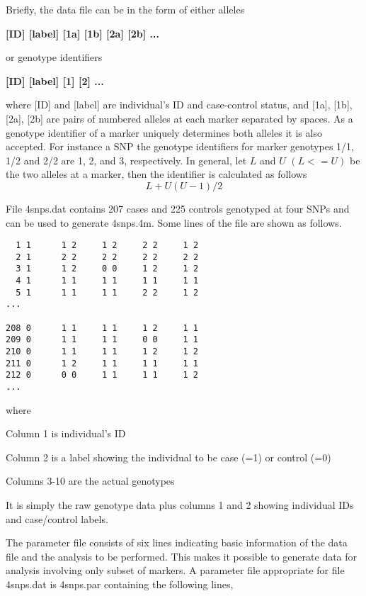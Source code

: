 \documentclass[11pt]{article}
\begin{document}
\medskip\noindent Briefly, the data file can be in the form of either
alleles

\medskip
       {\bf [ID] [label]  [1a]   [1b]   [2a]   [2b] ...}
\medskip

\medskip\noindent or genotype identifiers

\medskip
       {\bf [ID] [label]  [1]    [2] ...}
\medskip

\medskip\noindent where [ID] and [label] are individual's ID and
case-control status, and [1a], [1b], [2a], [2b] are pairs of
numbered alleles at each marker separated by spaces.  As a genotype
identifier of a marker uniquely determines both alleles it is also
accepted.  For instance a SNP the genotype identifiers for marker
genotypes 1/1, 1/2 and 2/2 are 1, 2, and 3, respectively.  In
general, let $L$ and $U$ $(L<=U)$ be the two alleles at a marker,
then the identifier is calculated as follows $$ L+U(U-1)/2$$

\medskip\noindent File 4snps.dat contains 207 cases and 225 controls
genotyped at four SNPs and can be used to generate 4snps.4m.  Some
lines of the file are shown as follows.

\begin{verbatim}
  1 1      1 2     1 2     2 2     1 2
  2 1      2 2     2 2     2 2     2 2
  3 1      1 2     0 0     1 2     1 2
  4 1      1 1     1 1     1 1     1 1
  5 1      1 1     1 1     2 2     1 2
...

208 0      1 1     1 1     1 2     1 1
209 0      1 1     1 1     0 0     1 1
210 0      1 1     1 1     1 2     1 2
211 0      1 2     1 1     1 1     1 1
212 0      0 0     1 1     1 1     1 2
...
\end{verbatim}

\medskip\noindent where

\medskip
\medskip\noindent Column 1 is individual's ID

\medskip\noindent Column 2 is a label showing the individual to be case (=1)
or control (=0)

\medskip\noindent Columns 3-10 are the actual genotypes
\medskip

\medskip\noindent It is simply the raw genotype data plus columns 1 and 2
showing individual IDs and case/control labels.

\medskip\noindent The parameter file consists of six lines indicating basic
information of the data file and the analysis to be performed. This
makes it possible to generate data for analysis involving only
subset of markers.  A parameter file appropriate for file 4snps.dat
is 4snps.par containing the following lines,
\end{document}
